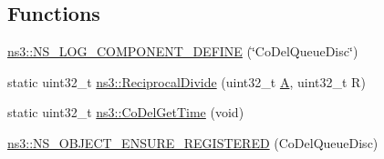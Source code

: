 \subsection*{Functions}
\begin{DoxyCompactItemize}
\item 
\hyperlink{namespacens3_ad126cf106141abef37b438137f1d7dce}{ns3\+::\+N\+S\+\_\+\+L\+O\+G\+\_\+\+C\+O\+M\+P\+O\+N\+E\+N\+T\+\_\+\+D\+E\+F\+I\+NE} (\char`\"{}Co\+Del\+Queue\+Disc\char`\"{})
\item 
static uint32\+\_\+t \hyperlink{namespacens3_a7a09fe0d1e3603e4580a739d233773e5}{ns3\+::\+Reciprocal\+Divide} (uint32\+\_\+t \hyperlink{generate__test__data__lte__sinr_8m_af16ce5dd1f5f83407a26f186ef5e5600}{A}, uint32\+\_\+t R)
\item 
static uint32\+\_\+t \hyperlink{namespacens3_affec668ac26bd382b1e7b79a30a192de}{ns3\+::\+Co\+Del\+Get\+Time} (void)
\item 
\hyperlink{namespacens3_a82a581ffc07f6e31ff253687891388e8}{ns3\+::\+N\+S\+\_\+\+O\+B\+J\+E\+C\+T\+\_\+\+E\+N\+S\+U\+R\+E\+\_\+\+R\+E\+G\+I\+S\+T\+E\+R\+ED} (Co\+Del\+Queue\+Disc)
\end{DoxyCompactItemize}
